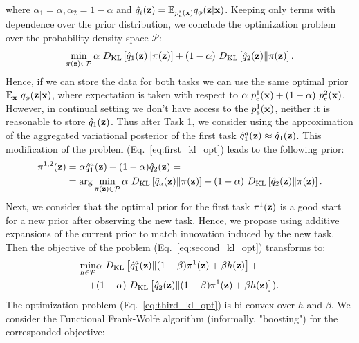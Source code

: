 where $\alpha_1=\alpha, \alpha_2=1-\alpha$ and $\hat{q}_{i}({\mathbf{z}})=\mathbb{E}_{p^{i}_{e}({\mathbf{x}})}q_{\phi}({\mathbf{z}}|{\mathbf{x}})$. 
Keeping only terms with dependence over the prior distribution, we conclude the optimization problem over the probability density space $\mathcal{P}$:
\begin{equation}
\label{eq:first_kl_opt}
\min\limits_{\pi(\rvz)\in\mathcal{P}}\alpha~\KL{\hat{q}_{1}(\rvz)}{\pi(\rvz)}  + (1-\alpha)~\KL{\hat{q}_{2}(\rvz)}{\pi(\rvz)}.
\end{equation}
Hence, if we can store the data for both tasks we can use the same optimal prior $\mathbb{E}_{{\mathbf{x}}}~q_{\phi}({\mathbf{z}}|{\mathbf{x}})$, where expectation is taken with respect to $\alpha~p^1_{e}({\mathbf{x}})+(1-\alpha)~ p^2_{e}({\mathbf{x}})$. However, in continual setting we don't have access to the $p_{e}^{1}({\mathbf{x}})$, neither it is reasonable to store $\hat{q}_{1}({\mathbf{z}})$. Thus after Task 1, we consider using the approximation of the aggregated variational posterior of the first task $\hat{q}_{1}^{a}({\mathbf{z}})\approx\hat{q}_{1}({\mathbf{z}})$. This modification of the problem (Eq.~\ref{eq:first_kl_opt}) leads to the following prior:
\begin{equation}
\label{eq:second_kl_opt}
\begin{aligned}
\pi^{1,2}(\rvz) &= \alpha \hat{q}_{1}^{a}(\rvz) + (1-\alpha) \hat{q}_{2}(\rvz) = \\
&= \arg\min\limits_{\pi(\rvz)\in\mathcal{P}}\alpha~\KL{\hat{q}_{a}(\rvz)}{\pi(\rvz)}  + (1-\alpha)~\KL{\hat{q}_{2}(\rvz)}{\pi(\rvz)}.
\end{aligned}
\end{equation}
Next, we consider that the optimal prior for the first task $\pi^{1}({\mathbf{z}})$ is a good start for a new prior after observing the new task. Hence, we propose using additive expansions of the current prior to match innovation induced by the new task. Then the objective of the problem (Eq.~\ref{eq:second_kl_opt}) transforms to:
\begin{equation}
\label{eq:third_kl_opt}
\begin{aligned}
\min\limits_{h\in\mathcal{P}} &\alpha~\KL{\hat{q}_{1}^{a}(\rvz)}{(1-\beta)\pi^{1}(\rvz)+\beta h(\rvz)} + \\
+ &(1-\alpha)~\KL{\hat{q}_{2}(\rvz)}{(1-\beta)\pi^{1}(\rvz)+\beta h(\rvz)}).
\end{aligned}
\end{equation}
The optimization problem (Eq.~\ref{eq:third_kl_opt}) is bi-convex over $h$ and $\beta$. We consider the Functional Frank-Wolfe algorithm (informally, "boosting") \citep{wang2015functional} for the corresponded objective:

